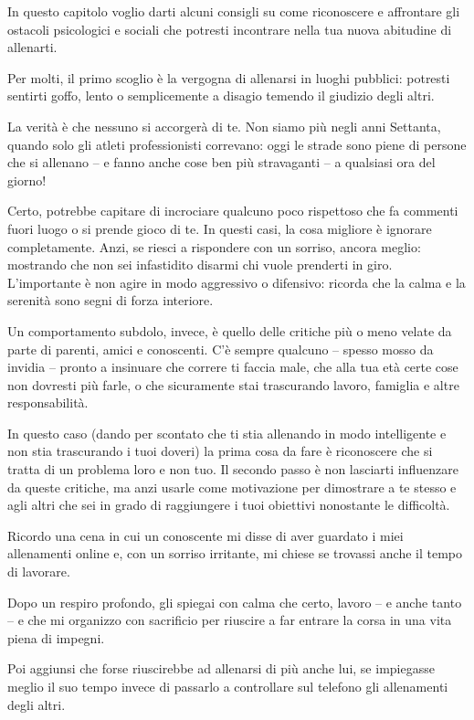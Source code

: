 In questo capitolo voglio darti alcuni consigli su come riconoscere e affrontare 
gli ostacoli psicologici e sociali
che potresti incontrare nella tua nuova abitudine di allenarti.

Per molti, il primo scoglio è la vergogna di allenarsi in luoghi pubblici:
potresti sentirti goffo, lento o semplicemente a disagio
temendo il giudizio degli altri.

La verità è che nessuno si accorgerà di te.
Non siamo più negli anni Settanta, quando solo gli atleti professionisti correvano:
oggi le strade sono piene di persone che si allenano
-- e fanno anche cose ben più stravaganti --
a qualsiasi ora del giorno!

Certo, potrebbe capitare di incrociare qualcuno poco rispettoso
che fa commenti fuori luogo o si prende gioco di te.
In questi casi, la cosa migliore è ignorare completamente.
Anzi, se riesci a rispondere con un sorriso,
ancora meglio:
mostrando che non sei infastidito disarmi chi vuole prenderti in giro.
L'importante è non agire in modo aggressivo o difensivo:
ricorda che la calma e la serenità sono segni di forza interiore.

Un comportamento subdolo, invece, è quello delle critiche più o meno
velate da parte di parenti, amici e conoscenti.
C'è sempre qualcuno -- spesso mosso da invidia --
pronto a insinuare che correre ti faccia male,
che alla tua età certe cose non dovresti più farle,
o che sicuramente stai trascurando lavoro, famiglia e altre responsabilità.

In questo caso
(dando per scontato che ti stia allenando in modo intelligente
e non stia trascurando i tuoi doveri)
la prima cosa da fare è riconoscere che si tratta di
un problema loro e non tuo.
Il secondo passo è non lasciarti influenzare da queste critiche,
ma anzi usarle come motivazione per dimostrare a te stesso e agli altri
che sei in grado di raggiungere i tuoi obiettivi nonostante le difficoltà.

Ricordo una cena in cui un conoscente mi disse
di aver guardato i miei allenamenti online
e, con un sorriso irritante, mi chiese
se trovassi anche il tempo di lavorare.

Dopo un respiro profondo, gli spiegai con calma
che certo, lavoro -- e anche tanto -- e che mi organizzo con sacrificio
per riuscire a far entrare la corsa in una vita piena di impegni.

Poi aggiunsi che forse riuscirebbe ad allenarsi di più anche lui,
se impiegasse meglio il suo tempo invece di passarlo
a controllare sul telefono gli allenamenti degli altri.

